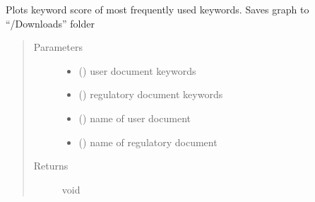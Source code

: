 \documentclass[letterpaper,10pt,english]{sphinxmanual}
\begin{document}

\begin{fulllineitems}
\label{\detokenize{functionsv1:common_functions.plotkeywordfrequency}}
Plots keyword score of most frequently used keywords. Saves graph to “/Downloads” folder
\begin{quote}\begin{description}
\item[{Parameters}] \leavevmode\begin{itemize}
\item {} 
 ({\hyperref[\detokenize{KeywordList:module-KeywordList}]{}}) \textendash{} user document keywords

\item {} 
 ({\hyperref[\detokenize{KeywordList:module-KeywordList}]{}}) \textendash{} regulatory document keywords

\item {} 
 () \textendash{} name of user document

\item {} 
 () \textendash{} name of regulatory document

\end{itemize}

\item[{Returns}] \leavevmode
void

\end{description}\end{quote}

\end{fulllineitems}

\end{document}
